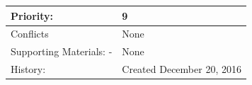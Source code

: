 \documentclass{scrreprt}
\begin{document}
\begin{table}[h!]
\begin{tabular}{|l|l|}
Priority:               & 9                                                                                                                                                                                                      \\ \hline
Conflicts               & None                                                                                                                                                                                                   \\ \hline
Supporting Materials: - & None                                                                                                                                                                                                   \\ \hline
History:                & Created December 20, 2016                                                                                                                                                                              \\ \hline
\end{tabular}
\end{table}
\FloatBarrier
\end{document}
